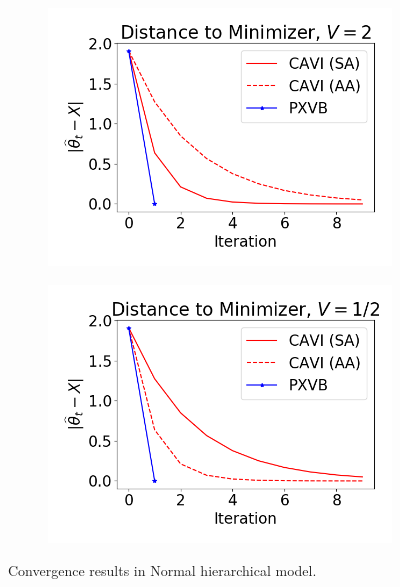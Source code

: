 \documentclass{article}
\begin{document}
\begin{figure}[h!]
\centering
    \begin{subfigure}[t]{0.325\textwidth}
        \includegraphics[width=\textwidth]{Probit_real/nm_convergence1.png}
    \end{subfigure}
          \begin{subfigure}[t]{0.325\textwidth}
        \includegraphics[width=\textwidth]{Probit_real/nm_convergence2.png}
    \end{subfigure}
    \caption{Convergence results in Normal hierarchical model.}
    \label{nm_case}
\end{figure}
\end{document}
